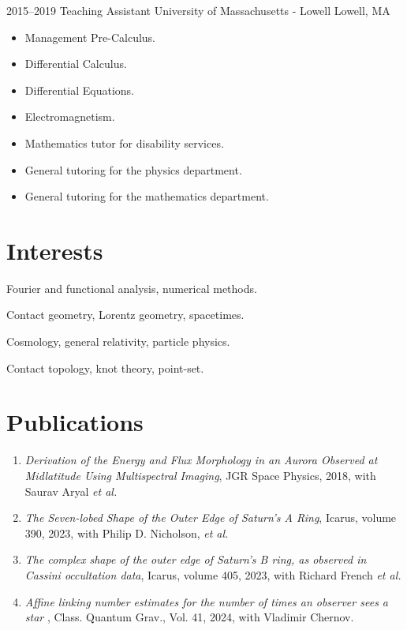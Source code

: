 \documentclass[a4paper,sans]{moderncv}
\begin{document}
        \cventry%
            {2015--2019}
            {Teaching Assistant}
            {University of Massachusetts - Lowell}
            {Lowell, MA}
            {}
            {%
                \begin{itemize}
                    \item
                        Management Pre-Calculus.
                    \item
                        Differential Calculus.
                    \item
                        Differential Equations.
                    \item
                        Electromagnetism.
                    \item
                        Mathematics tutor for disability services.
                    \item
                        General tutoring for the physics department.
                    \item
                        General tutoring for the mathematics department.
                \end{itemize}%
            }
    \section{Interests}
            Fourier and functional analysis, numerical methods.\par
            Contact geometry, Lorentz geometry, spacetimes.\par
            Cosmology, general relativity, particle physics.\par
            Contact topology, knot theory, point-set.
    \section{Publications}
        \begin{enumerate}
            \item
                \textit{Derivation of the Energy and Flux Morphology in an
                Aurora Observed at Midlatitude Using Multispectral Imaging},
                JGR Space Physics, 2018, with Saurav Aryal \textit{et al.}
            \item
                \textit{The Seven-lobed Shape of the Outer
                Edge of Saturn’s A Ring}, Icarus, volume 390, 2023, with
                Philip D. Nicholson, \textit{et al.}
            \item
                \textit{The complex shape of the outer edge of Saturn’s B ring,
                as observed in Cassini occultation data},
                Icarus, volume 405, 2023, with Richard French \textit{et al.}
            \item
                \textit{%
                    Affine linking number estimates for the number of
                    times an observer sees a star%
                },
                Class. Quantum Grav., Vol. 41, 2024, with Vladimir Chernov.
        \end{enumerate}
\end{document}
